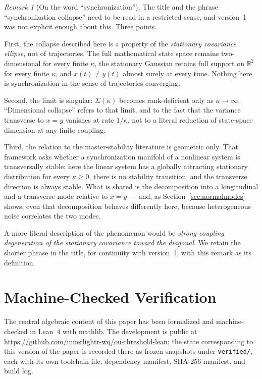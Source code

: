 \documentclass[11pt]{article}
\theoremstyle{plain}
\theoremstyle{remark}
\newtheorem{remark}{Remark}
\begin{document}
\begin{remark}[On the word ``synchronization'']\label{rem:synch}
The title and the phrase ``synchronization collapse'' need to be read in a restricted sense,
and version~1 was not explicit enough about this. Three points.

First, the collapse described here is a property of the \emph{stationary covariance ellipse},
not of trajectories. The full mathematical state space remains two-dimensional for every finite
$\kappa$, the stationary Gaussian retains full support on $\mathbb{R}^2$ for every finite
$\kappa$, and $x(t)\neq y(t)$ almost surely at every time. Nothing here is synchronization in
the sense of trajectories converging.

Second, the limit is singular: $\Sigma(\kappa)$ becomes rank-deficient only as
$\kappa\to\infty$. ``Dimensional collapse'' refers to that limit, and to the fact that the
variance transverse to $x=y$ vanishes at rate $1/\kappa$, not to a literal reduction of
state-space dimension at any finite coupling.

Third, the relation to the master-stability literature \cite{PecoraCarroll1998} is geometric
only. That framework asks whether a synchronization manifold of a nonlinear system is
transversally stable; here the linear system has a globally attracting stationary distribution
for every $\kappa\ge0$, there is no stability transition, and the transverse direction is
always stable. What is shared is the decomposition into a longitudinal and a transverse mode
relative to $x=y$ --- and, as Section~\ref{sec:normalmodes} shows, even that decomposition
behaves differently here, because heterogeneous noise correlates the two modes.

A more literal description of the phenomenon would be \emph{strong-coupling degeneration of the
stationary covariance toward the diagonal}. We retain the shorter phrase in the title, for
continuity with version~1, with this remark as its definition.
\end{remark}

\section{Machine-Checked Verification}\label{sec:lean}

The central algebraic content of this paper has been formalized and machine-checked in Lean~4
with mathlib. The development is public at
\url{https://github.com/innerlightr-wq/ou-threshold-lean}; the state corresponding to this
version of the paper is recorded there as frozen snapshots under \texttt{verified/}, each with
its own toolchain file, dependency manifest, SHA-256 manifest, and build log.
\end{document}
